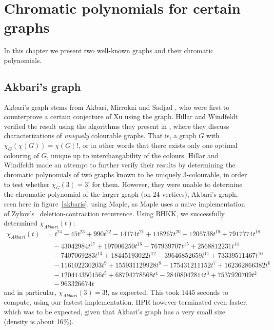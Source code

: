 \documentclass{cslthse-msc}
\begin{document}
\chapter{Chromatic polynomials for certain graphs}
In this chapter we present two well-known graphs and their chromatic polynomials.

\section{Akbari's graph}
Akbari's graph stems from Akbari, Mirrokni and Sadjad \cite{akbari}, who were first to counterprove a certain conjecture of Xu using the graph. Hillar and Windfeldt verified the result using the algorithms they present in \cite{hillar_windfeldt}, where they discuss characterizations of \emph{uniquely} colourable graphs. That is, a graph $G$ with $\chi_G(\chi(G)) = \chi(G)!$, or in other words that there exists only one optimal colouring of $G$, unique up to interchangability of the colours. 
Hillar and Windfeldt made an attempt to further verify their results by determining the chromatic polynomials of two graphs known to be uniquely 3-colourable, in order to test whether $\chi_G(3) = 3!$ for them. However, they were unable to determine the chromatic polynomial of the larger graph (on 24 vertices), Akbari's graph, seen here in figure~\ref{akbaris}, using Maple, as Maple uses a naive implementation of Zykov's~\cite{aazykov} deletion-contraction recurrence.  Using BHKK, we successfully determined $\chi_{Akbari}(t)$:
\begin{equation*}
\begin{split}
\chi_{Akbari}(t) & =  t^{24} - 45t^{23} + 990t^{22} -14174t^{21} + 148267t^{20} - 1205738t^{19} + 7917774t^{18} \\ 
& \quad - 43042984t^{17} + 197006250t^{16} - 767939707t^{15} + 2568812231t^{14} \\ & \quad - 7407069283t^{13} 
+ 18445193022t^{12} - 39646852659t^{11} + 73339511467t^{10} \\ & \quad - 116102230203t^9 
+ 155931129928t^8 - 175431211152t^7 + 162362866382t^6 \\ & \quad - 120414350156t^5 
+ 68794778568t^4 - 28408042814t^3 + 7537920709t^2 \\ & \quad - 963326674t
\end{split}
\end{equation*}
and in particular, $\chi_{Akbari}(3) = 3!$, as expected. This took $1445$ seconds to compute, using our fastest implementation. HPR however terminated even faster, which was to be expected, given that Akbari's graph has a very small size (density is about 16\%).
\end{document}
